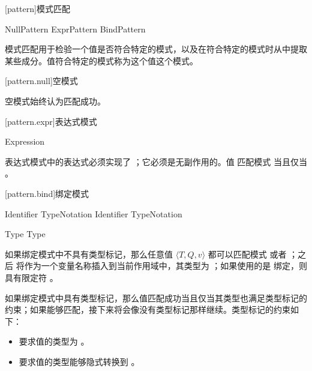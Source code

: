 
[pattern]{模式匹配}

\begin{bnf}
 \br
    NullPattern \br
    ExprPattern \br
    BindPattern
\end{bnf}

\pnum
模式匹配用于检验一个值是否符合特定的模式，以及在符合特定的模式时从中提取某些成分。值符合特定的模式称为这个值这个模式。

[pattern.null]{空模式}

\begin{bnf}
 \br
    \tcode{_}
\end{bnf}

\pnum
空模式始终认为匹配成功。

[pattern.expr]{表达式模式}

\begin{bnf}
 \br
    Expression
\end{bnf}

\pnum
表达式模式中的表达式必须实现了 ；它必须是无副作用的。值  匹配模式  当且仅当 。

[pattern.bind]{绑定模式}

\begin{bnf}
 \br
     Identifier TypeNotation\bnfq \br
     Identifier TypeNotation\bnfq
\end{bnf}

\begin{bnf}
 \br
     Type \br
    \terminal{:} Type
\end{bnf}

\pnum
如果绑定模式中不具有类型标记，那么任意值 $\langle T, Q, v \rangle$ 都可以匹配模式  或者 ；之后  将作为一个变量名称插入到当前作用域中，其类型为 ；如果使用的是  绑定，则具有限定符 。

\pnum
如果绑定模式中具有类型标记，那么值匹配成功当且仅当其类型也满足类型标记的约束；如果能够匹配，接下来将会像没有类型标记那样继续。类型标记的约束如下：

\begin{itemize}
\item {} 要求值的类型为 。
\item {} 要求值的类型能够隐式转换到 。
\end{itemize}
